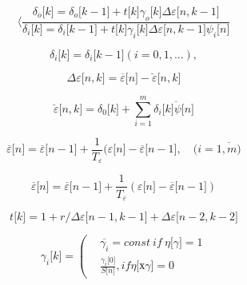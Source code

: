 \begin{equation}
\langle\frac{\delta_{o}\lbrack k\rbrack = \delta_{o}\lbrack k - 1\rbrack + t\lbrack k\rbrack\gamma_{o}\lbrack k\rbrack\Delta\varepsilon\lbrack n,k - 1\rbrack}{\delta_{i}\lbrack k\rbrack = \delta_{i}\lbrack k - 1\rbrack + t\lbrack k\rbrack\gamma_{i}\lbrack k\rbrack\Delta\varepsilon\lbrack n,k - 1\rbrack\psi_{i}\lbrack n\rbrack}
\end{equation}

\begin{equation}
\delta_{i}\lbrack k\rbrack = \delta_{i}\lbrack k - 1\rbrack(i = 0,1,...),
\end{equation}

\begin{equation}
\Delta\varepsilon\lbrack n,k\rbrack = \overline{\varepsilon}\lbrack n\rbrack - \breve{\varepsilon}\lbrack n,k\rbrack
\end{equation}

\begin{equation}
\breve{\varepsilon}\lbrack n,k\rbrack = \delta_{0}\lbrack k\rbrack + \sum_{i = 1}^{m}{\delta_{i}\lbrack k\overline{\rbrack\psi}\lbrack n\rbrack}
\end{equation}

\begin{equation}
\overline{\varepsilon}\lbrack n\rbrack = \overline{\varepsilon}\lbrack n - 1\rbrack + \frac{1}{T_{\varepsilon}}(\varepsilon\lbrack n\rbrack - \overline{\varepsilon}\lbrack n - 1\rbrack,\quad (i = \overline{1,m)}
\end{equation}

\begin{equation}
\overline{\varepsilon}\lbrack n\rbrack = \overline{\varepsilon}\lbrack n - 1\rbrack + \frac{1}{T_{\varepsilon}}(\varepsilon\lbrack n\rbrack - \overline{\varepsilon}\lbrack n - 1\rbrack)
\end{equation}

\begin{equation}
t\lbrack k\rbrack = 1 + r/\Delta\varepsilon\lbrack n - 1,k - 1\rbrack + \Delta\varepsilon\lbrack n - 2,k - 2\rbrack
\end{equation}

\begin{equation}
\gamma_{i}\lbrack k\rbrack = \left( \begin{aligned}
 & \overline{\gamma_{i}} = const\ if\ \eta\lbrack\gamma\rbrack = 1 \\
 & \frac{\gamma_{i}\lbrack 0\rbrack}{S\lbrack n\rbrack},if\eta\lbrack х\gamma\rbrack = 0
\end{aligned} \right.
\end{equation}

